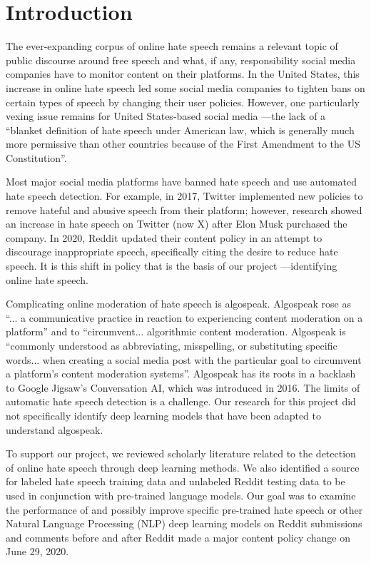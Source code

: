 \documentclass[conference]{IEEEtran}
\begin{document}
\section{Introduction}
The ever-expanding corpus of online hate speech remains a relevant topic of public discourse around free speech and what, if any, responsibility social media companies have to monitor content on their platforms. In the United States, this increase in online hate speech led some social media companies to tighten bans on certain types of speech by changing their user policies. However, one particularly vexing issue remains for United States-based social media ---the lack of a “blanket definition of hate speech under American law, which is generally much more permissive than other countries because of the First Amendment to the US Constitution”\cite{b1}. 

Most major social media platforms have banned hate speech and use automated hate speech detection\cite{b2}. For example, in 2017, Twitter implemented new policies to remove hateful and abusive speech from their platform\cite{b3}; however, research showed an increase in hate speech on Twitter (now X) after Elon Musk purchased the company\cite{b1}. In 2020, Reddit updated their content policy in an attempt to discourage inappropriate speech, specifically citing the desire to reduce hate speech\cite{b4}. It is this shift in policy that is the basis of our project ---identifying online hate speech.

Complicating online moderation of hate speech is algospeak. Algospeak rose as “... a communicative practice in reaction to experiencing content moderation on a platform” and to “circumvent... algorithmic content moderation\cite{b5}. Algospeak is “commonly understood as abbreviating, misspelling, or substituting specific words... when creating a social media post with the particular goal to circumvent a platform’s content moderation systems”\cite{b5}. Algospeak has its roots in a backlash to Google Jigsaw’s Conversation AI, which was introduced in 2016\cite{b6}. The limits of automatic hate speech detection is a challenge. Our research for this project did not specifically identify deep learning models that have been adapted to understand algospeak.

To support our project, we reviewed scholarly literature related to the detection of online hate speech through deep learning methods. We also identified a source for labeled hate speech training data and unlabeled Reddit testing data to be used in conjunction with pre-trained language models. Our goal was to examine the performance of and possibly improve specific pre-trained hate speech or other Natural Language Processing (NLP) deep learning models on Reddit submissions and comments before and after Reddit made a major content policy change on June 29, 2020.
\end{document}
